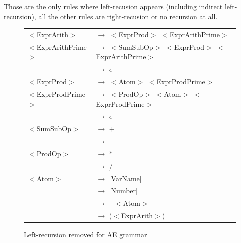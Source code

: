 \documentclass[letterpaper]{article}
\begin{document}
Those are the only rules where left-recusion appears (including indirect
left-recursion), all the other rules
are right-recusion or no recursion at all.
\begin{figure}[H]
    \centering
    \begin{tabular}{l l}
        $<$ExprArith$>$ & $\rightarrow$
        $<$ExprProd$>$ $<$ExprArithPrime$>$ \\

        $<$ExprArithPrime$>$ & $\rightarrow$
        $<$SumSubOp$>$ $<$ExprProd$>$ $<$ExprArithPrime$>$ \\
         & $\rightarrow$ $\epsilon$\\


        $<$ExprProd$>$ & $\rightarrow$ $<$Atom$>$ $<$ExprProdPrime$>$\\

        $<$ExprProdPrime$>$ & $\rightarrow$
        $<$ProdOp$>$ $<$Atom$>$ $<$ExprProdPrime$>$\\
         & $\rightarrow$ $\epsilon$\\


        $<$SumSubOp$>$ & $\rightarrow$ $+$\\
         & $\rightarrow$ $-$\\

        $<$ProdOp$>$ & $\rightarrow$ $*$\\
         & $\rightarrow$ $/$\\

        $<$Atom$>$ & $\rightarrow$ [VarName]\\
         & $\rightarrow$ [Number]\\
         & $\rightarrow$ - $<$Atom$>$\\
         & $\rightarrow$ ($<$ExprArith$>$)\\

    \end{tabular}
    \caption{Left-recursion removed for AE grammar}
    \label{fig:AE-noleft}
\end{figure}
\end{document}
